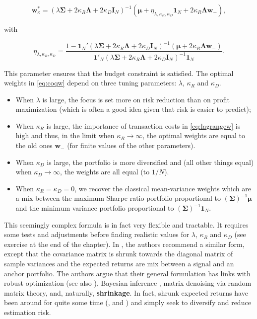 \begin{equation}
\label{eq:coqw}
\textbf{w}^*_\kappa=  (\lambda \boldsymbol{\Sigma}+2\kappa_R \boldsymbol{\Lambda} +2\kappa_D\textbf{I}_N)^{-1} \left(\boldsymbol{\mu} + \eta_{\lambda,\kappa_R,\kappa_D} \textbf{1}_N+2\kappa_R \boldsymbol{\Lambda}\textbf{w}_-\right),
\end{equation}

with

\begin{equation}
\eta_{\lambda,\kappa_R,\kappa_D}=\frac{1- \textbf{1}_N'(\lambda\boldsymbol{\Sigma}+2\kappa_R \boldsymbol{\Lambda}+2\kappa_D\textbf{I}_N)^{-1}(\boldsymbol{\mu}+2\kappa_R\boldsymbol{\Lambda}\textbf{w}_-)}{\textbf{1}'_N(\lambda \boldsymbol{\Sigma}+2\kappa_R \boldsymbol{\Lambda}+2\kappa_D\textbf{I}_N)^{-1}\textbf{1}_N}.
\end{equation}

This parameter ensures that the budget constraint is satisfied. The optimal weights in \ref{eq:coqw} depend on three tuning parameters: $\lambda$, $\kappa_R$ and $\kappa_D$.

\begin{itemize}
\item When $\lambda$ is large, the focus is set more on risk reduction than on profit maximization (which is often a good idea given that risk is easier to predict);
\item When $\kappa_R$ is large, the importance of transaction costs in \ref{eq:lagrangew} is high and thus, in the limit when $\kappa_R \rightarrow \infty$, the optimal weights are equal to the old ones $\textbf{w}_ -$ (for finite values of the other parameters).
\item When $\kappa_D$ is large, the portfolio is more diversified and (all other things equal) when $\kappa_D \rightarrow \infty$, the weights are all equal (to $1/N$).
\item When $\kappa_R=\kappa_D=0$, we recover the classical mean-variance weights which are a mix between the maximum Sharpe ratio portfolio proportional to $(\boldsymbol{\Sigma})^{ -1} \boldsymbol{\mu}$ and the minimum variance portfolio proportional to $(\boldsymbol{\Sigma})^{ -1} \textbf{1}_N$.
\end{itemize}

This seemingly complex formula is in fact very flexible and tractable. It requires some tests and adjustments before finding realistic values for $\lambda$, $\kappa_R$ and $\kappa_D$ (see exercise at the end of the chapter). In \cite{pedersen2020enhanced}, the authors recommend a similar form, except that the covariance matrix is shrunk towards the diagonal matrix of sample variances and the expected returns are mix between a signal and an anchor portfolio. The authors argue that their general formulation has links with robust optimization (see also \cite{kim2014deciphering}), Bayesian inference \citep{lai2011mean}, matrix denoising via random matrix theory, and, naturally, \textbf{shrinkage}. In fact, shrunk expected returns have been around for quite some time (\cite{jorion1985international}, \cite{kan2007optimal} and \cite{bodnar2013equivalence}) and simply seek to diversify and reduce estimation risk.

